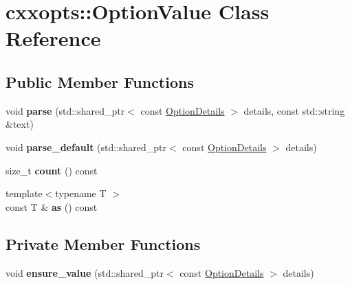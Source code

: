 \hypertarget{classcxxopts_1_1OptionValue}{}\section{cxxopts\+:\+:Option\+Value Class Reference}
\label{classcxxopts_1_1OptionValue}
\subsection*{Public Member Functions}
\begin{DoxyCompactItemize}
\item 
void {\bfseries parse} (std\+::shared\+\_\+ptr$<$ const \hyperlink{classcxxopts_1_1OptionDetails}{Option\+Details} $>$ details, const std\+::string \&text)\hypertarget{classcxxopts_1_1OptionValue_aefe55cbd666c20a761e628c1686def5c}{}\label{classcxxopts_1_1OptionValue_aefe55cbd666c20a761e628c1686def5c}

\item 
void {\bfseries parse\+\_\+default} (std\+::shared\+\_\+ptr$<$ const \hyperlink{classcxxopts_1_1OptionDetails}{Option\+Details} $>$ details)\hypertarget{classcxxopts_1_1OptionValue_abf66e063085167a33a3f930007df2036}{}\label{classcxxopts_1_1OptionValue_abf66e063085167a33a3f930007df2036}

\item 
size\+\_\+t {\bfseries count} () const \hypertarget{classcxxopts_1_1OptionValue_a103cefdcec0566b22dfd29eee8d55097}{}\label{classcxxopts_1_1OptionValue_a103cefdcec0566b22dfd29eee8d55097}

\item 
{\footnotesize template$<$typename T $>$ }\\const T \& {\bfseries as} () const \hypertarget{classcxxopts_1_1OptionValue_ab932a2aaf3b8f15f8cfefeec4c7b0878}{}\label{classcxxopts_1_1OptionValue_ab932a2aaf3b8f15f8cfefeec4c7b0878}

\end{DoxyCompactItemize}
\subsection*{Private Member Functions}
\begin{DoxyCompactItemize}
\item 
void {\bfseries ensure\+\_\+value} (std\+::shared\+\_\+ptr$<$ const \hyperlink{classcxxopts_1_1OptionDetails}{Option\+Details} $>$ details)\hypertarget{classcxxopts_1_1OptionValue_abc33a4b9a1f7f1289cb782edfb372e45}{}\label{classcxxopts_1_1OptionValue_abc33a4b9a1f7f1289cb782edfb372e45}

\end{DoxyCompactItemize}
